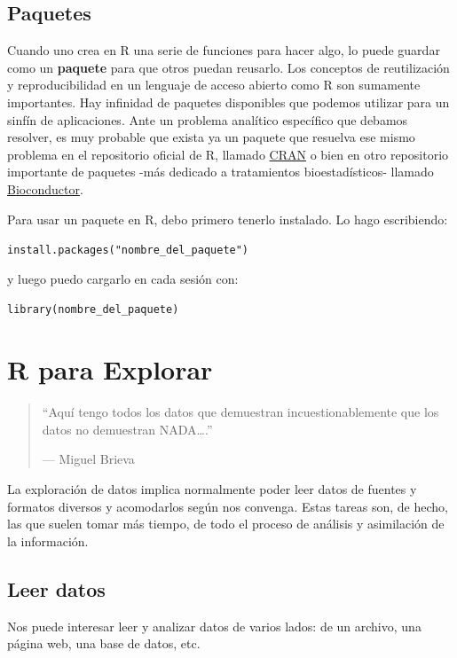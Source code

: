\documentclass[]{book}
\theoremstyle{definition}
\theoremstyle{definition}
\theoremstyle{definition}
\theoremstyle{remark}
\begin{document}
\hypertarget{paquetes}{%
\section{Paquetes}\label{paquetes}}

Cuando uno crea en R una serie de funciones para hacer algo, lo puede
guardar como un \textbf{paquete} para que otros puedan reusarlo. Los
conceptos de reutilización y reproducibilidad en un lenguaje de acceso
abierto como R son sumamente importantes. Hay infinidad de paquetes
disponibles que podemos utilizar para un sinfín de aplicaciones. Ante un
problema analítico específico que debamos resolver, es muy probable que
exista ya un paquete que resuelva ese mismo problema en el repositorio
oficial de R, llamado \href{https://cran.r-project.org/}{CRAN} o bien en
otro repositorio importante de paquetes -más dedicado a tratamientos
bioestadísticos- llamado
\href{https://www.bioconductor.org/}{Bioconductor}.

Para usar un paquete en R, debo primero tenerlo instalado. Lo hago
escribiendo:

\texttt{install.packages("nombre\_del\_paquete")}

y luego puedo cargarlo en cada sesión con:

\texttt{library(nombre\_del\_paquete)}

\hypertarget{r-para-explorar}{%
\chapter{R para Explorar}\label{r-para-explorar}}

\begin{quote}
``Aquí tengo todos los datos que demuestran incuestionablemente que los
datos no demuestran NADA\ldots{}.''

--- Miguel Brieva
\end{quote}

La exploración de datos implica normalmente poder leer datos de fuentes
y formatos diversos y acomodarlos según nos convenga. Estas tareas son,
de hecho, las que suelen tomar más tiempo, de todo el proceso de
análisis y asimilación de la información.

\hypertarget{leer-datos}{%
\section{Leer datos}\label{leer-datos}}

Nos puede interesar leer y analizar datos de varios lados: de un
archivo, una página web, una base de datos, etc.
\end{document}
